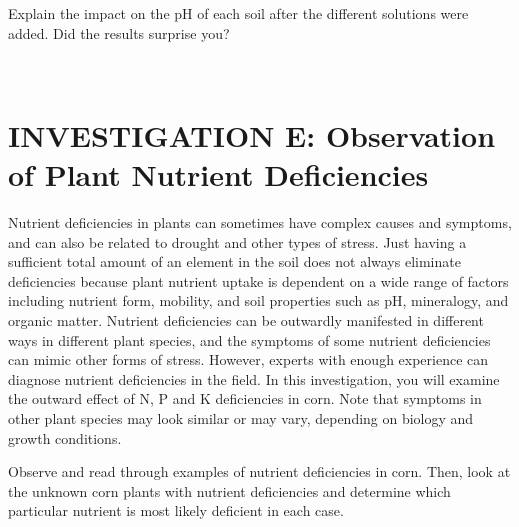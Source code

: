 \documentclass[
  letterpaper,
  twocolumn,
  portrait]{scrbook}
\begin{document}
Explain the impact on the pH of each soil after the different solutions
were added. Did the results surprise you?

~ ~ ~

\hypertarget{investigation-e-observation-of-plant-nutrient-deficiencies}{%
\section{INVESTIGATION E: Observation of Plant Nutrient
Deficiencies}\label{investigation-e-observation-of-plant-nutrient-deficiencies}}

Nutrient deficiencies in plants can sometimes have complex causes and
symptoms, and can also be related to drought and other types of stress.
Just having a sufficient total amount of an element in the soil does not
always eliminate deficiencies because plant nutrient uptake is dependent
on a wide range of factors including nutrient form, mobility, and soil
properties such as pH, mineralogy, and organic matter. Nutrient
deficiencies can be outwardly manifested in different ways in different
plant species, and the symptoms of some nutrient deficiencies can mimic
other forms of stress. However, experts with enough experience can
diagnose nutrient deficiencies in the field. In this investigation, you
will examine the outward effect of N, P and K deficiencies in corn. Note
that symptoms in other plant species may look similar or may vary,
depending on biology and growth conditions.

Observe and read through examples of nutrient deficiencies in corn.
Then, look at the unknown corn plants with nutrient deficiencies and
determine which particular nutrient is most likely deficient in each
case.

 
  \providecommand{\huxb}[2]{\arrayrulecolor[RGB]{#1}\global\arrayrulewidth=#2pt}
  \providecommand{\huxvb}[2]{\color[RGB]{#1}\vrule width #2pt}
  \providecommand{\huxtpad}[1]{\rule{0pt}{#1}}
  \providecommand{\huxbpad}[1]{\rule[-#1]{0pt}{#1}}
\end{document}
